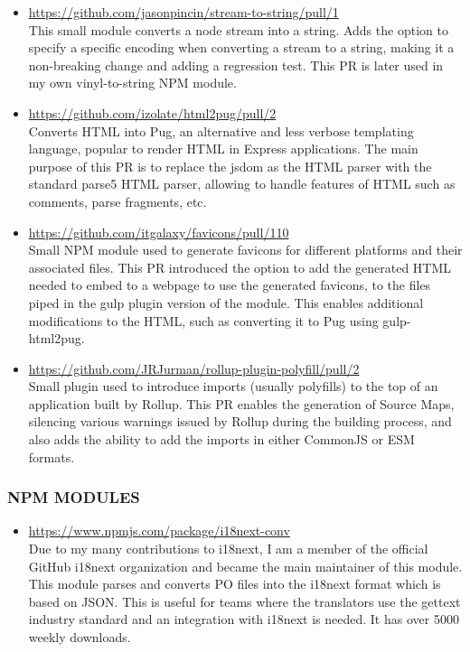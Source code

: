 \documentclass{res}
\begin{document}
\begin{resume}
\begin{itemize}
  \item \url{https://github.com/jasonpincin/stream-to-string/pull/1} \\
  This small module converts a node stream into a string.
  Adds the option to specify a specific encoding when converting a stream to
  a string, making it a non-breaking change and adding a regression test.
  This PR is later used in my own vinyl-to-string NPM module.

  \item \url{https://github.com/izolate/html2pug/pull/2} \\
  Converts HTML into Pug, an alternative and less verbose templating language,
  popular to render HTML in Express applications. The main purpose of this PR
  is to replace the jsdom as the HTML parser with the standard parse5 HTML
  parser, allowing to handle features of HTML such as comments, parse fragments,
  etc.

  \item \url{https://github.com/itgalaxy/favicons/pull/110} \\
  Small NPM module used to generate favicons for different platforms and their
  associated files. This PR introduced the option to add the generated HTML
  needed to embed to a webpage to use the generated favicons, to the files piped
  in the gulp plugin version of the module. This enables additional modifications
  to the HTML, such as converting it to Pug using gulp-html2pug.

  \item \url{https://github.com/JRJurman/rollup-plugin-polyfill/pull/2} \\
  Small plugin used to introduce imports (usually polyfills) to the top of an
  application built by Rollup. This PR enables the generation of Source Maps,
  silencing various warnings issued by Rollup during the building process,
  and also adds the ability to add the imports in either CommonJS or ESM
  formats.
\end{itemize}

\subsubsection{NPM MODULES}

\begin{itemize}
  \item \url{https://www.npmjs.com/package/i18next-conv} \\
  Due to my many contributions to i18next, I am a member of the official
  GitHub i18next organization and became the main maintainer of this module.
  This module parses and converts PO files into the i18next format which
  is based on JSON. This is useful for teams where the translators use
  the gettext industry standard and an integration with i18next is needed.
  It has over 5000 weekly downloads.


\end{itemize}
\end{resume}
\end{document}
